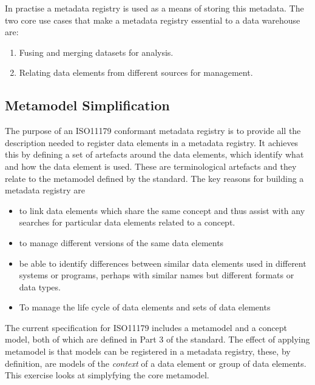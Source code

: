 \documentclass{article}
\begin{document}

In practise a metadata registry is used as a means of storing this metadata.  The two core use cases that make a metadata registry essential to a data warehouse are:
\begin{enumerate}
	\item Fusing and merging datasets for analysis.
	\item Relating data elements from different sources for management.
\end{enumerate}



\subsection{Metamodel Simplification}

The purpose of an ISO11179 conformant metadata registry is to provide all the description needed to register data elements in a metadata registry. It achieves this by defining a set of artefacts around the data elements, which identify what and how the data element is used. These are terminological artefacts and they relate to the metamodel defined by the standard. The key reasons for building a metadata registry are 
\begin{itemize}
	\item to link data elements which share the same concept and thus assist with any searches for particular data elements related to a concept.
	\item to manage different versions of the same data elements 
	\item be able to identify differences between similar data elements used in different systems or programs, perhaps with similar names but different formats or data types.
	\item To manage the life cycle of data elements and sets of data elements
\end{itemize}

The current specification for ISO11179 includes a metamodel and a concept model, both of which are defined in Part 3 of the standard. The effect of applying metamodel is that models can be registered in a metadata registry, these, by definition, are models of the \emph{context} of a data element or group of data elements. This exercise looks at simplyfying the core metamodel.
\end{document}

